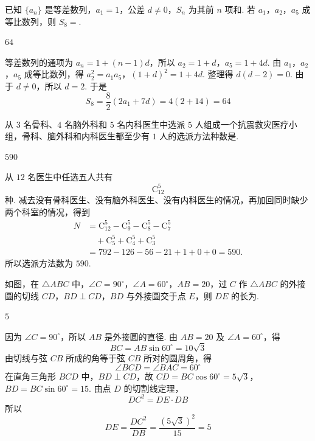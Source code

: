\begin{problem}
已知 \( \{a_{n}\} \) 是等差数列，\( a_{1}=1 \)，公差 \( d\neq0 \)，\( S_{n} \) 为其前 \( n \) 项和. 若 \(a_{1}\)，\(a_{2}\)，\(a_{5}\) 成等比数列，则 \( S_{8}= \)\fillinblank{}.

\begin{answer}
\(64\)
\end{answer}

\begin{solution}
等差数列的通项为 \(a_n=1+(n-1)d\)，所以
\(a_2=1+d\)，\(a_5=1+4d\).
由 \(a_1\)，\(a_2\)，\(a_5\) 成等比数列，得
\(a_2^2=a_1a_5\)，\((1+d)^2=1+4d\).
整理得 \(d(d-2)=0\). 由于 \(d\neq0\)，所以 \(d=2\). 于是
\[
S_8=\frac{8}{2}\left(2a_1+7d\right)=4(2+14)=64
\]
\end{solution}
\end{problem}

\begin{problem}
从 \(3\) 名骨科、\(4\) 名脑外科和 \(5\) 名内科医生中选派 \(5\) 人组成一个抗震救灾医疗小组，骨科、脑外科和内科医生都至少有 \(1\) 人的选派方法种数是\fillinblank{}.

\begin{answer}
\(590\)
\end{answer}

\begin{solution}
从 \(12\) 名医生中任选五人共有
\[
\mathrm C_{12}^{5}
\]
种. 减去没有骨科医生、没有脑外科医生、没有内科医生的情况，再加回同时缺少两个科室的情况，得到
\[
\begin{aligned}
N
&=\mathrm C_{12}^{5}-\mathrm C_{9}^{5}-\mathrm C_{8}^{5}-\mathrm C_{7}^{5}\\
&\quad+\mathrm C_{5}^{5}+\mathrm C_{4}^{5}+\mathrm C_{3}^{5}\\
&=792-126-56-21+1+0+0=590.
\end{aligned}
\]
所以选派方法数为 \(590\).
\end{solution}
\end{problem}

\begin{problem}
如图，在 \(\triangle ABC\) 中，\(\angle C = 90^{\circ}\)，\(\angle A = 60^{\circ}\)，\(AB = 20\)，过 \(C\) 作 \(\triangle ABC\) 的外接圆的切线 \(CD\)，\(BD \perp CD\)，\(BD\) 与外接圆交于点 \(E\)，则 \(DE\) 的长为\fillinblank{}.


\begin{answer}
\(5\)
\end{answer}

\begin{solution}
因为 \(\angle C=90^{\circ}\)，所以 \(AB\) 是外接圆的直径. 由 \(AB=20\) 及 \(\angle A=60^{\circ}\)，得
\[
BC=AB\sin60^{\circ}=10\sqrt3
\]
由切线与弦 \(CB\) 所成的角等于弦 \(CB\) 所对的圆周角，得
\[
\angle BCD=\angle BAC=60^{\circ}
\]
在直角三角形 \(BCD\) 中，\(BD\perp CD\)，故
\(CD=BC\cos60^{\circ}=5\sqrt3\)，\(BD=BC\sin60^{\circ}=15\).
由点 \(D\) 的切割线定理，
\[
DC^2=DE\cdot DB
\]
所以
\[
DE=\frac{DC^2}{DB}=\frac{(5\sqrt3)^2}{15}=5
\]
\end{solution}
\end{problem}

